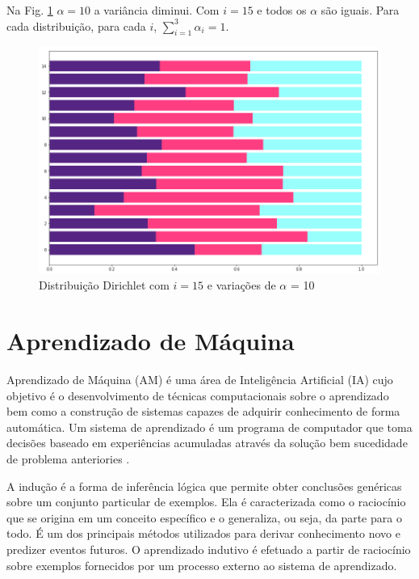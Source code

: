 Na Fig. \ref{dist-dir:alpha10} $\alpha=10$ a variância diminui. Com $i=15$ e todos os $\alpha$ são iguais. Para cada distribuição, para cada $i$, $\sum_{i=1}^{3} \alpha_i = 1$.


\begin{figure}[!h]
	\centering
	\includegraphics[keepaspectratio=true,scale=0.4]{figuras/resultados-dist-dir-10-3.png}
	\caption{Distribuição Dirichlet com $i=15$ e variações de $\alpha$ = 10 }
	\label{dist-dir:alpha10}
\end{figure}


\section{Aprendizado de Máquina}

Aprendizado de Máquina (AM) é uma área de Inteligência Artificial (IA) cujo objetivo é o desenvolvimento de técnicas computacionais sobre o aprendizado bem como a construção de sistemas capazes de adquirir conhecimento de forma automática. Um sistema de aprendizado é um programa de computador que toma decisões baseado em experiências acumuladas através da solução bem sucedidade de problema anteriories \cite{monard2003}. 


A indução é a forma de inferência lógica que permite obter conclusões genéricas sobre um conjunto particular de exemplos. 
Ela é caracterizada como o raciocínio que se origina em um conceito específico e o generaliza, ou seja, da parte para o todo. É um dos principais métodos utilizados para derivar conhecimento novo e predizer eventos futuros. O aprendizado indutivo é efetuado a partir de raciocínio sobre exemplos fornecidos por um processo externo ao sistema de aprendizado.

